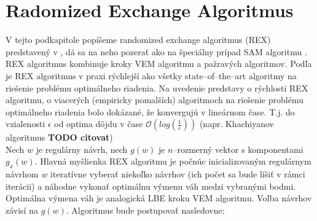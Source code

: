 \section {Radomized Exchange Algoritmus}

V tejto podkapitole popíšeme randomized exchange algoritmus (REX) predstavený v \cite{rex_harman}, dá sa na neho pozerať ako na špeciálny prípad SAM algoritmu \cite{rex_harman}. REX algoritmus kombinuje kroky VEM algoritmu a pažravých algoritmov. Podľa \cite{rex_harman} je REX algoritmus v praxi rýchlejší ako všetky state--of--the--art algoritmy na riešenie problému optimálneho riadenia. Na uvedenie predstavy o rýchlosti REX algoritmu, o viacerých (empiricky pomalších) algoritmoch na riešenie problému optimálneho riadenia bolo dokázané, že konvergujú v lineárnom čase. T.j. do vzialenosti $\epsilon$ od optima dôjdu v čase $\mathcal{O}(log(\frac{1}{\epsilon}))$ (napr. Khachiyanov algoritmus \textbf{TODO citovat})\\

Nech $w$ je regulárny návrh, nech $g(w)$ je $n$--rozmerný vektor s komponentami $g_x(w)$. Hlavná myšlienka REX algoritmu je počnúc inicializovaným regulárnym návrhom $w$ iteratívne vyberať niekoľko návrhov (ich počet sa bude líšiť v rámci iterácii) a náhodne vykonať optimálnu výmenu váh medzi vybranými bodmi. Optimálna výmena váh je analogická LBE kroku VEM algoritmu. Voľba návrhov závisí na $g(w)$. Algoritmus bude postupovať nasledovne:


